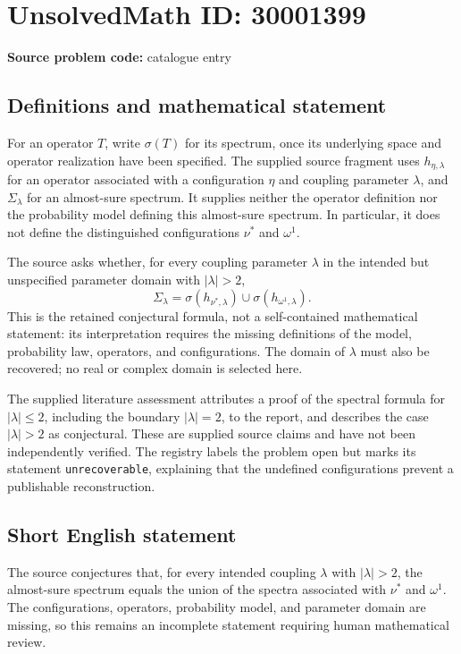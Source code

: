\documentclass[11pt]{article}
\begin{document}
\section*{UnsolvedMath ID: 30001399}
\textbf{Source problem code:} catalogue entry
\subsection{Definitions and mathematical statement}
For an operator \(T\), write \(\sigma(T)\) for its spectrum, once its underlying space and operator realization have been specified. The supplied source fragment uses \(h_{\eta,\lambda}\) for an operator associated with a configuration \(\eta\) and coupling parameter \(\lambda\), and \(\Sigma_\lambda\) for an almost-sure spectrum. It supplies neither the operator definition nor the probability model defining this almost-sure spectrum. In particular, it does not define the distinguished configurations \(\nu^*\) and \(\omega^1\).

The source asks whether, for every coupling parameter \(\lambda\) in the intended but unspecified parameter domain with \(|\lambda|>2\),
\[
\Sigma_\lambda
=
\sigma\!\left(h_{\nu^*,\lambda}\right)
\cup
\sigma\!\left(h_{\omega^1,\lambda}\right).
\]
This is the retained conjectural formula, not a self-contained mathematical statement: its interpretation requires the missing definitions of the model, probability law, operators, and configurations. The domain of \(\lambda\) must also be recovered; no real or complex domain is selected here.

The supplied literature assessment attributes a proof of the spectral formula for \(|\lambda|\leq 2\), including the boundary \(|\lambda|=2\), to the report, and describes the case \(|\lambda|>2\) as conjectural. These are supplied source claims and have not been independently verified. The registry labels the problem open but marks its statement \texttt{unrecoverable}, explaining that the undefined configurations prevent a publishable reconstruction.
\subsection{Short English statement}
The source conjectures that, for every intended coupling \(\lambda\) with \(|\lambda|>2\), the almost-sure spectrum equals the union of the spectra associated with \(\nu^*\) and \(\omega^1\). The configurations, operators, probability model, and parameter domain are missing, so this remains an incomplete statement requiring human mathematical review.
\end{document}
